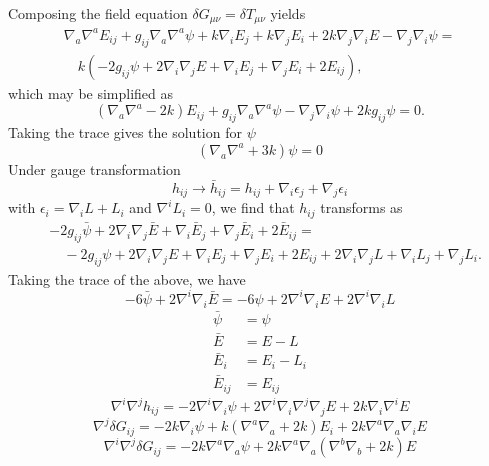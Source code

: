 \documentclass[10pt,letterpaper]{article}
\begin{document}
Composing the field equation $\delta G_{\mu\nu} = \delta T_{\mu\nu}$ yields
\begin{align}
\nabla_{a}\nabla^{a}E_{ij}
 + g_{ij} \nabla_{a}\nabla^{a}\psi
 + k \nabla_{i}E_{j}
 + k \nabla_{j}E_{i}
 + 2 k \nabla_{j}\nabla_{i}E
 -  \nabla_{j}\nabla_{i}\psi =\\
\quad k (-2 g_{ij}\psi + 2\nabla_i\nabla_j E + \nabla_i E_j + \nabla_j E_i + 2E_{ij}),
\end{align}
which may be simplified as
\begin{equation}
(\nabla_a \nabla^a-2k)E_{ij} + g_{ij}\nabla_a \nabla^a \psi - \nabla_j\nabla_i \psi+2k g_{ij}\psi = 0.
\end{equation}
Taking the trace gives the solution for $\psi$
\begin{equation}
(\nabla_a \nabla^a + 3k)\psi = 0
\end{equation}
Under gauge transformation 
\begin{equation}
h_{ij} \to \bar h_{ij} = h_{ij} + \nabla_i \epsilon _j + \nabla_j \epsilon_i
\end{equation}
with $\epsilon_i = \nabla_i L + L_i$ and $\nabla^i L_i = 0$,
we find that $h_{ij}$ transforms as 
\begin{align}
&-2 g_{ij}\bar \psi + 2\nabla_i\nabla_j \bar E + \nabla_i \bar E_j + \nabla_j \bar E_i + 2\bar E_{ij} =\\ 
&\quad-2 g_{ij}\psi + 2\nabla_i\nabla_j E + \nabla_i E_j + \nabla_j E_i + 2E_{ij} + 2 \nabla_i\nabla_j L + \nabla_i L_j + \nabla_j L_i.
\end{align}
Taking the trace of the above, we have
\begin{equation}
-6 \bar\psi  +2\nabla^i \nabla_i \bar E = -6\psi + 2\nabla^i\nabla_i E + 2\nabla^i\nabla_i L
\end{equation}
\begin{align}
\bar\psi &= \psi\\
\bar E &= E-L\\
\bar E_i &= E_i - L_i\\
\bar E_{ij} &= E_{ij}
\end{align}
\begin{equation}
\nabla^i \nabla^j h_{ij} = -2\nabla^i \nabla_i \psi + 2\nabla^i\nabla_i \nabla^j\nabla_j E + 2k \nabla_i \nabla^i E
\end{equation}
\begin{equation}
\nabla^j \delta G_{ij} =  -2k\nabla_i \psi + k(\nabla^a\nabla_a + 2k)E_i + 2k \nabla^a\nabla_a \nabla_i E 
\end{equation}
\begin{equation}
\nabla^i \nabla^j \delta G_{ij} = -2k\nabla^a \nabla_a \psi + 2k \nabla^a\nabla_a(\nabla^b \nabla_b + 2k)E
\end{equation}
\end{document}
